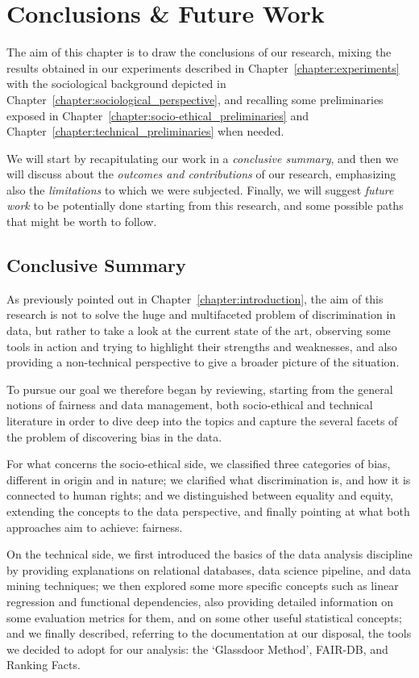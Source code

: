 \chapter{Conclusions \& Future Work}
\label{chapter:conclusions_future_work}
\thispagestyle{empty}

The aim of this chapter is to draw the conclusions of our research, mixing the results obtained in our experiments described in Chapter~\ref{chapter:experiments} with the sociological background depicted in Chapter~\ref{chapter:sociological_perspective}, and recalling some preliminaries exposed in Chapter~\ref{chapter:socio-ethical_preliminaries} and Chapter~\ref{chapter:technical_preliminaries} when needed.

We will start by recapitulating our work in a \textit{conclusive summary}, and then we will discuss about the \textit{outcomes and contributions} of our research, emphasizing also the \textit{limitations} to which we were subjected. Finally, we will suggest \textit{future work} to be potentially done starting from this research, and some possible paths that might be worth to follow.


\section{Conclusive Summary}
As previously pointed out in Chapter~\ref{chapter:introduction}, the aim of this research is not to solve the huge and multifaceted problem of discrimination in data, but rather to take a look at the current state of the art, observing some tools in action and trying to highlight their strengths and weaknesses, and also providing a non-technical perspective to give a broader picture of the situation.

To pursue our goal we therefore began by reviewing, starting from the general notions of fairness and data management, both socio-ethical and technical literature in order to dive deep into the topics and capture the several facets of the problem of discovering bias in the data.

For what concerns the socio-ethical side, we classified three categories of bias, different in origin and in nature; we clarified what discrimination is, and how it is connected to human rights; and we distinguished between equality and equity, extending the concepts to the data perspective, and finally pointing at what both approaches aim to achieve: fairness.

On the technical side, we first introduced the basics of the data analysis discipline by providing explanations on relational databases, data science pipeline, and data mining techniques; we then explored some more specific concepts such as linear regression and functional dependencies, also providing detailed information on some evaluation metrics for them, and on some other useful statistical concepts; and we finally described, referring to the documentation at our disposal, the tools we decided to adopt for our analysis: the `Glassdoor Method', FAIR-DB, and Ranking Facts.

